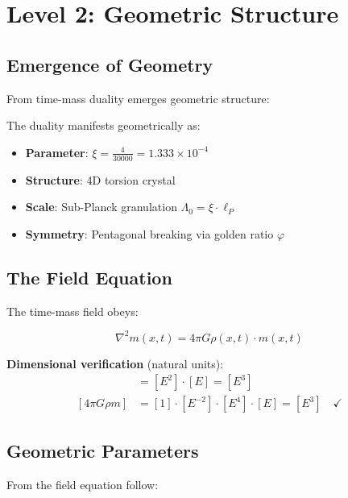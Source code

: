 	\section{Level 2: Geometric Structure}
	
	\subsection{Emergence of Geometry}
	
	From time-mass duality emerges geometric structure:
	
	\begin{keyresult}
		The duality manifests geometrically as:
		
		\begin{itemize}
			\item \textbf{Parameter}: $\xi = \frac{4}{30000} = 1.333 \times 10^{-4}$
			\item \textbf{Structure}: 4D torsion crystal
			\item \textbf{Scale}: Sub-Planck granulation $\Lambda_0 = \xi \cdot \ell_P$
			\item \textbf{Symmetry}: Pentagonal breaking via golden ratio $\varphi$
		\end{itemize}
	\end{keyresult}
	
	\subsection{The Field Equation}
	
	The time-mass field obeys:
	
	\begin{equation}
		\boxed{\nabla^2 m(x,t) = 4\pi G \rho(x,t) \cdot m(x,t)}
	\end{equation}
	
	\textbf{Dimensional verification} (natural units):
	\begin{align}
		[\nabla^2 m] &= [E^2] \cdot [E] = [E^3] \\
		[4\pi G \rho m] &= [1] \cdot [E^{-2}] \cdot [E^4] \cdot [E] = [E^3] \quad \checkmark
	\end{align}
	
	\subsection{Geometric Parameters}
	
	From the field equation follow:
	

